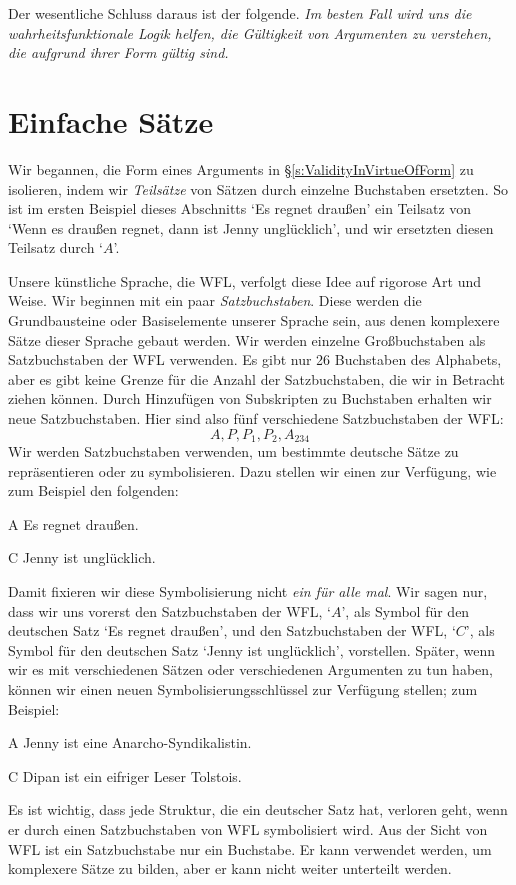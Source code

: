 Der wesentliche Schluss daraus ist der folgende. \emph{Im besten Fall wird uns die wahrheitsfunktionale Logik helfen, die Gültigkeit von Argumenten zu verstehen, die aufgrund ihrer Form gültig sind.}

\section{Einfache Sätze}

Wir begannen, die Form eines Arguments in \S\ref{s:ValidityInVirtueOfForm} zu isolieren, indem wir \emph{Teilsätze} von Sätzen durch einzelne Buchstaben ersetzten. So ist im ersten Beispiel dieses Abschnitts `Es regnet drau{\ss}en' ein Teilsatz von `Wenn es drau{\ss}en regnet, dann ist Jenny unglücklich', und wir ersetzten diesen Teilsatz durch `$A$'. 

Unsere künstliche Sprache, die WFL, verfolgt diese Idee auf rigorose Art und Weise. Wir beginnen mit ein paar \emph{Satzbuchstaben}. Diese werden die Grundbausteine oder Basiselemente unserer Sprache sein, aus denen komplexere Sätze dieser Sprache gebaut werden. Wir werden einzelne Gro{\ss}buchstaben als Satzbuchstaben der WFL verwenden. Es gibt nur 26 Buchstaben des Alphabets, aber es gibt keine Grenze für die Anzahl der Satzbuchstaben, die wir in Betracht ziehen können. Durch Hinzufügen von Subskripten zu Buchstaben erhalten wir neue Satzbuchstaben. Hier sind also fünf verschiedene Satzbuchstaben der WFL: 
	$$A, P, P_1, P_2, A_{234}$$
Wir werden Satzbuchstaben verwenden, um bestimmte deutsche Sätze zu repräsentieren oder zu symbolisieren. Dazu stellen wir einen  zur Verfügung, wie zum Beispiel den folgenden:
	\begin{ekey}
		\item[A] Es regnet drau{\ss}en.
		\item[C] Jenny ist unglücklich.
	\end{ekey}
Damit fixieren wir diese Symbolisierung nicht \emph{ein für alle mal}. Wir sagen nur, dass wir uns vorerst den Satzbuchstaben der WFL, `$A$', als Symbol für den deutschen Satz `Es regnet drau{\ss}en', und den Satzbuchstaben der WFL, `$C$', als Symbol für den deutschen Satz `Jenny ist unglücklich', vorstellen. Später, wenn wir es mit verschiedenen Sätzen oder verschiedenen Argumenten zu tun haben, können wir einen neuen Symbolisierungsschlüssel zur Verfügung stellen; zum Beispiel:
	\begin{ekey}
		\item[A] Jenny ist eine Anarcho-Syndikalistin.
		\item[C] Dipan ist ein eifriger Leser Tolstois.
	\end{ekey}
Es ist wichtig, dass jede Struktur, die ein deutscher Satz hat, verloren geht, wenn er durch einen Satzbuchstaben von WFL symbolisiert wird. Aus der Sicht von WFL ist ein Satzbuchstabe nur ein Buchstabe. Er kann verwendet werden, um komplexere Sätze zu bilden, aber er kann nicht weiter unterteilt werden.


